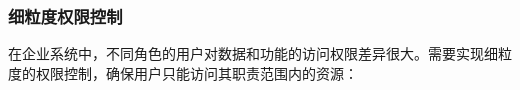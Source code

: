 \begin{Shaded}
\begin{Highlighting}[]
            \OperatorTok{(}\OperatorTok{(}\OperatorTok{,} \OperatorTok{));}
        \OperatorTok{\}}
        
        \OperatorTok{(}\OperatorTok{)}
                \OperatorTok{(}\OperatorTok{(}\OperatorTok{,} \OperatorTok{));}
    \OperatorTok{\}}
\OperatorTok{\}}
\end{Highlighting}
\end{Shaded}

\subsubsection{细粒度权限控制}\label{ux7ec6ux7c92ux5ea6ux6743ux9650ux63a7ux5236}

在企业系统中，不同角色的用户对数据和功能的访问权限差异很大。需要实现细粒度的权限控制，确保用户只能访问其职责范围内的资源：

